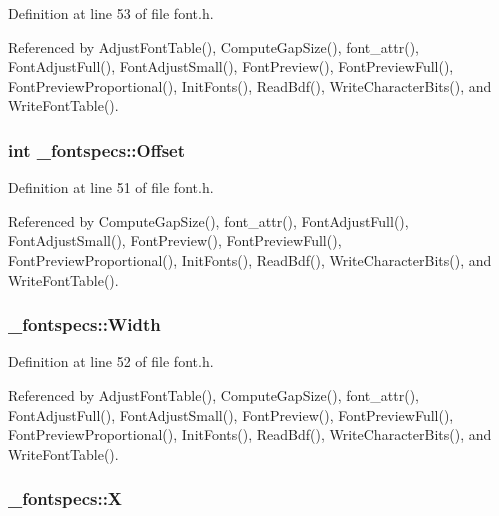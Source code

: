 Definition at line 53 of file font.\+h.



Referenced by Adjust\+Font\+Table(), Compute\+Gap\+Size(), font\+\_\+attr(), Font\+Adjust\+Full(), Font\+Adjust\+Small(), Font\+Preview(), Font\+Preview\+Full(), Font\+Preview\+Proportional(), Init\+Fonts(), Read\+Bdf(), Write\+Character\+Bits(), and Write\+Font\+Table().

\subsubsection[{\texorpdfstring{Offset}{Offset}}]{\setlength{\rightskip}{0pt plus 5cm}int \+\_\+fontspecs\+::\+Offset}\hypertarget{struct__fontspecs_ad4ef5755b58ecd3bbc9894cee258091e}{}\label{struct__fontspecs_ad4ef5755b58ecd3bbc9894cee258091e}


Definition at line 51 of file font.\+h.



Referenced by Compute\+Gap\+Size(), font\+\_\+attr(), Font\+Adjust\+Full(), Font\+Adjust\+Small(), Font\+Preview(), Font\+Preview\+Full(), Font\+Preview\+Proportional(), Init\+Fonts(), Read\+Bdf(), Write\+Character\+Bits(), and Write\+Font\+Table().

\subsubsection[{\texorpdfstring{Width}{Width}}]{ \+\_\+fontspecs\+::\+Width}\hypertarget{struct__fontspecs_a8404888a24a2b065d91c4424e1907439}{}\label{struct__fontspecs_a8404888a24a2b065d91c4424e1907439}


Definition at line 52 of file font.\+h.



Referenced by Adjust\+Font\+Table(), Compute\+Gap\+Size(), font\+\_\+attr(), Font\+Adjust\+Full(), Font\+Adjust\+Small(), Font\+Preview(), Font\+Preview\+Full(), Font\+Preview\+Proportional(), Init\+Fonts(), Read\+Bdf(), Write\+Character\+Bits(), and Write\+Font\+Table().

\subsubsection[{\texorpdfstring{X}{X}}]{ \+\_\+fontspecs\+::X}\hypertarget{struct__fontspecs_a7273a891c79308389718266cb0b66f56}{}\label{struct__fontspecs_a7273a891c79308389718266cb0b66f56}


